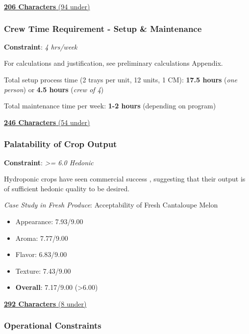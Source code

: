 \documentclass{../tex/report}
\begin{document}
\uline{\textbf{206 Characters} (94 under)}

\vspace{0.5cm}

\subsubsection{Crew Time Requirement - Setup \& Maintenance}
\label{sec:constraints-crewtime} 

\textbf{Constraint}: \textit{4 hrs/week}

For calculations and justification, see preliminary calculations Appendix.

Total setup process time (2 trays per unit, 12 units, 1 CM): \textbf{17.5 hours} (\textit{one person}) or \textbf{4.5 hours} (\textit{crew of 4})

Total maintenance time per week: \textbf{1-2 hours} (depending on program)

\uline{\textbf{246 Characters} (54 under)}

\newpage

\subsubsection{Palatability of Crop Output} 
\label{sec:constraints-palatability}

\textbf{Constraint}: \textit{>= 6.0 Hedonic}

Hydroponic crops have seen commercial success \cite{commercialhydro}, suggesting that their output is of sufficient hedonic quality to be desired.

\textit{Case Study in Fresh Produce}: Acceptability of Fresh Cantaloupe Melon \cite{melon}

\begin{itemize}
    \item Appearance: 7.93/9.00
    \item Aroma: 7.77/9.00
    \item Flavor: 6.83/9.00
    \item Texture: 7.43/9.00
    \item \textbf{Overall}: 7.17/9.00 (>6.00)
\end{itemize}

\uline{\textbf{292 Characters} (8 under)}

\vspace{0.5cm}

\subsubsection{Operational Constraints} 
\label{sec:constraints-operational}
\end{document}
